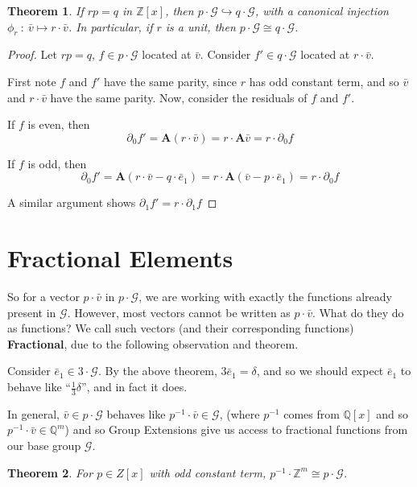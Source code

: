\documentclass[12pt]{article}
\newcommand{\G}{\mathcal{G}}
\newcommand{\Z}{\mathbb{Z}}
\newcommand{\Q}{\mathbb{Q}}
\newcommand{\2}{\textbf{2}}
\newcommand{\Am}{\textbf{A}}
\newcommand{\del}{\partial}
\renewcommand{\v}{\bar{v}}
\newcommand{\e}{\bar{e}}
\newtheorem{thm}{Theorem}
\begin{document}
\begin{thm}
  If $rp = q$ in $\Z[x]$, then $p \cdot \G \hookrightarrow q \cdot \G$, 
  with a canonical injection $\phi_r~:~\v \mapsto r \cdot \v$. 
  In particular, if $r$ is a unit, then $p \cdot \G \cong q \cdot \G$.
\end{thm}

\begin{proof}
  Let $rp = q$, $f \in p \cdot \G$ located at $\v$.
  Consider $f' \in q \cdot \G$ located at $r \cdot \v$.

  First note $f$ and $f'$ have the same parity, since 
  $r$ has odd constant term, and so $\v$ and $r \cdot \v$
  have the same parity. Now, consider the residuals of $f$ and $f'$. 
  
  If $f$ is even, then 
  \[ \del_0 f' = \Am (r \cdot \v) = r \cdot \Am \v = r \cdot \del_0 f \]

  If $f$ is odd, then
  \[ \del_0 f' = \Am (r \cdot \v - q \cdot \e_1) 
               = r \cdot \Am (\v - p \cdot \e_1)
               = r \cdot \del_0 f \]

  A similar argument shows $\del_1 f' = r \cdot \del_1 f$
\end{proof}

\section{Fractional Elements}
So for a vector $p \cdot \v$ in $p \cdot \G$, we are working with exactly
the functions already present in $\G$. However, most vectors cannot be written
as $p \cdot \v$. What do they do as functions?
We call such vectors (and their corresponding functions)
\textbf{Fractional}, due to the following observation and theorem.

Consider $\e_1 \in 3 \cdot \G$. By the above theorem, $3\e_1 = \delta$,
and so we should expect $\e_1$ to behave like ``$\frac{1}{3}\delta$'', 
and in fact it does.

In general, $\v \in p \cdot \G$ behaves like $p^{-1} \cdot \v \in \G$,
(where $p^{-1}$ comes from $\Q[x]$ and so $p^{-1} \cdot \v \in \Q^m$)
and so Group Extensions give us access to fractional functions from 
our base group $\G$.

\begin{thm}
  For $p \in Z[x]$ with odd constant term, 
  $p^{-1} \cdot \Z^m \cong p \cdot \G$.
\end{thm}
\end{document}
